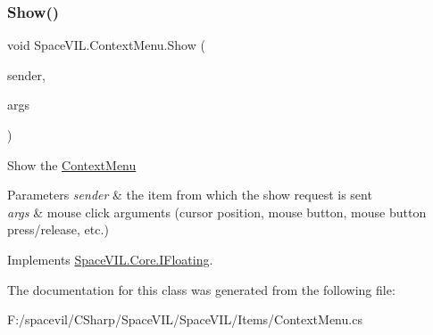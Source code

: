 \subsubsection{\texorpdfstring{Show()}{Show()}}
{\footnotesize\ttfamily void Space\+V\+I\+L.\+Context\+Menu.\+Show (\begin{DoxyParamCaption}\item[{\mbox{\hyperlink{interface_space_v_i_l_1_1_core_1_1_i_item}{I\+Item}}}]{sender,  }\item[{\mbox{\hyperlink{class_space_v_i_l_1_1_core_1_1_mouse_args}{Mouse\+Args}}}]{args }\end{DoxyParamCaption})}



Show the \mbox{\hyperlink{class_space_v_i_l_1_1_context_menu}{Context\+Menu}} 


\begin{DoxyParams}{Parameters}
{\em sender} & the item from which the show request is sent \\
\hline
{\em args} & mouse click arguments (cursor position, mouse button, mouse button press/release, etc.) \\
\hline
\end{DoxyParams}


Implements \mbox{\hyperlink{interface_space_v_i_l_1_1_core_1_1_i_floating}{Space\+V\+I\+L.\+Core.\+I\+Floating}}.



The documentation for this class was generated from the following file\+:\begin{DoxyCompactItemize}
\item 
F\+:/spacevil/\+C\+Sharp/\+Space\+V\+I\+L/\+Space\+V\+I\+L/\+Items/Context\+Menu.\+cs\end{DoxyCompactItemize}
